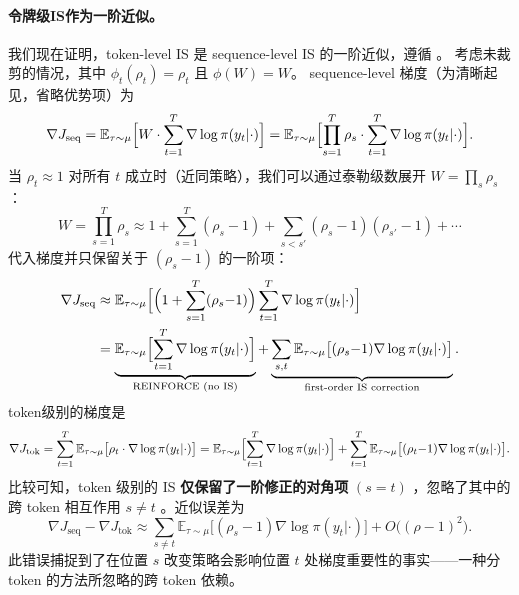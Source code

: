\documentclass{article}
\theoremstyle{plain}
\theoremstyle{definition}
\theoremstyle{remark}
\begin{document}
\paragraph{令牌级IS作为一阶近似。}
我们现在证明，token-level IS 是 sequence-level IS 的一阶近似，遵循 \citet{Zheng2025StabilizingRL}。  
考虑未裁剪的情况，其中 $\phi_t(\rho_t) = \rho_t$ 且 $\phi(W) = W$。  
sequence-level 梯度（为清晰起见，省略优势项）为
\begin{equation}
  \nabla J_{\text{seq}} = \mathbb{E}_{\tau \sim \mu}\Bigl[W \cdot \sum_{t=1}^{T} \nabla \log \pi(y_t | \cdot)\Bigr] = \mathbb{E}_{\tau \sim \mu}\Bigl[\prod_{s=1}^{T} \rho_s \cdot \sum_{t=1}^{T} \nabla \log \pi(y_t | \cdot)\Bigr].
\end{equation}
当 $\rho_t \approx 1$ 对所有 $t$ 成立时（近同策略），我们可以通过泰勒级数展开 $W = \prod_s \rho_s$：
\begin{equation}
  W = \prod_{s=1}^{T} \rho_s \approx 1 + \sum_{s=1}^{T} (\rho_s - 1) + \sum_{s < s'} (\rho_s - 1)(\rho_{s'} - 1) + \cdots
\end{equation}
代入梯度并只保留关于 $(\rho_s - 1)$ 的一阶项：
\begin{align}
  \nabla J_{\text{seq}} & \approx \mathbb{E}_{\tau \sim \mu}\Bigl[\Bigl(1 + \sum_{s=1}^{T} (\rho_s {-} 1)\Bigr) \sum_{t=1}^{T} \nabla \log \pi(y_t | \cdot)\Bigr]                                                                                                                                     \\
                        & = \underbrace{\mathbb{E}_{\tau \sim \mu}\Bigl[\sum_{t=1}^{T} \nabla \log \pi(y_t | \cdot)\Bigr]}_{\text{REINFORCE (no IS)}} + \underbrace{\sum_{s,t} \mathbb{E}_{\tau \sim \mu}\bigl[(\rho_s {-} 1) \nabla \log \pi(y_t | \cdot)\bigr]}_{\text{first-order IS correction}}.
\end{align}
token级别的梯度是
\begin{equation}
  \nabla J_{\text{tok}} = \sum_{t=1}^{T} \mathbb{E}_{\tau \sim \mu}\bigl[\rho_t \cdot \nabla \log \pi(y_t | \cdot)\bigr] = \mathbb{E}_{\tau \sim \mu}\Bigl[\sum_{t=1}^{T} \nabla \log \pi(y_t | \cdot)\Bigr] + \sum_{t=1}^{T} \mathbb{E}_{\tau \sim \mu}\bigl[(\rho_t {-} 1) \nabla \log \pi(y_t | \cdot)\bigr].
\end{equation}
比较可知，token 级别的 IS \textbf{仅保留了一阶修正的对角项} $(s = t)$ ，忽略了其中的跨 token 相互作用 $s \neq t$ 。近似误差为
\begin{equation}
  \label{eq:token-approx-error}
  \nabla J_{\text{seq}} - \nabla J_{\text{tok}} \approx \sum_{s \neq t} \mathbb{E}_{\tau \sim \mu}\bigl[(\rho_s - 1) \nabla \log \pi(y_t | \cdot)\bigr] + O\bigl((\rho - 1)^2\bigr).
\end{equation}
此错误捕捉到了在位置 $s$ 改变策略会影响位置 $t$ 处梯度重要性的事实——一种分 token 的方法所忽略的跨 token 依赖。
\end{document}
